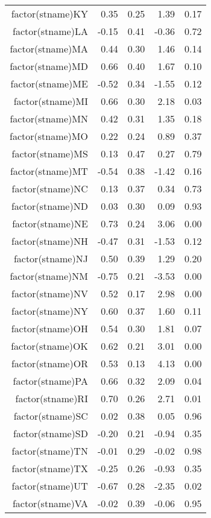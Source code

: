 \begin{table}[ht]
\begin{tabular}{rrrrr}
  factor(stname)KY & 0.35 & 0.25 & 1.39 & 0.17 \\ 
  factor(stname)LA & -0.15 & 0.41 & -0.36 & 0.72 \\ 
  factor(stname)MA & 0.44 & 0.30 & 1.46 & 0.14 \\ 
  factor(stname)MD & 0.66 & 0.40 & 1.67 & 0.10 \\ 
  factor(stname)ME & -0.52 & 0.34 & -1.55 & 0.12 \\ 
  factor(stname)MI & 0.66 & 0.30 & 2.18 & 0.03 \\ 
  factor(stname)MN & 0.42 & 0.31 & 1.35 & 0.18 \\ 
  factor(stname)MO & 0.22 & 0.24 & 0.89 & 0.37 \\ 
  factor(stname)MS & 0.13 & 0.47 & 0.27 & 0.79 \\ 
  factor(stname)MT & -0.54 & 0.38 & -1.42 & 0.16 \\ 
  factor(stname)NC & 0.13 & 0.37 & 0.34 & 0.73 \\ 
  factor(stname)ND & 0.03 & 0.30 & 0.09 & 0.93 \\ 
  factor(stname)NE & 0.73 & 0.24 & 3.06 & 0.00 \\ 
  factor(stname)NH & -0.47 & 0.31 & -1.53 & 0.12 \\ 
  factor(stname)NJ & 0.50 & 0.39 & 1.29 & 0.20 \\ 
  factor(stname)NM & -0.75 & 0.21 & -3.53 & 0.00 \\ 
  factor(stname)NV & 0.52 & 0.17 & 2.98 & 0.00 \\ 
  factor(stname)NY & 0.60 & 0.37 & 1.60 & 0.11 \\ 
  factor(stname)OH & 0.54 & 0.30 & 1.81 & 0.07 \\ 
  factor(stname)OK & 0.62 & 0.21 & 3.01 & 0.00 \\ 
  factor(stname)OR & 0.53 & 0.13 & 4.13 & 0.00 \\ 
  factor(stname)PA & 0.66 & 0.32 & 2.09 & 0.04 \\ 
  factor(stname)RI & 0.70 & 0.26 & 2.71 & 0.01 \\ 
  factor(stname)SC & 0.02 & 0.38 & 0.05 & 0.96 \\ 
  factor(stname)SD & -0.20 & 0.21 & -0.94 & 0.35 \\ 
  factor(stname)TN & -0.01 & 0.29 & -0.02 & 0.98 \\ 
  factor(stname)TX & -0.25 & 0.26 & -0.93 & 0.35 \\ 
  factor(stname)UT & -0.67 & 0.28 & -2.35 & 0.02 \\ 
  factor(stname)VA & -0.02 & 0.39 & -0.06 & 0.95 \\ 

\end{tabular}
\end{table}
